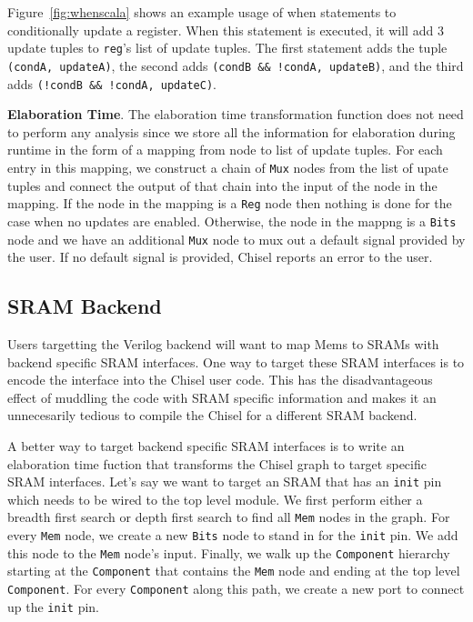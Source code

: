 Figure~\ref{fig:whenscala} shows an example usage of when statements
to conditionally update a register. When this statement is executed,
it will add 3 update tuples to {\tt reg}'s list of update tuples. The
first statement adds the tuple {\tt (condA, updateA)}, the second adds
{\tt (condB \&\& !condA, updateB)}, and the third adds
{\tt (!condB \&\& !condA, updateC)}.

{\bf Elaboration Time}. The elaboration time transformation function
does not need to perform any analysis since we store all the
information for elaboration during runtime in the form of a mapping
from node to list of update tuples. For each entry in this mapping, we
construct a chain of {\tt Mux} nodes from the list of upate tuples and
connect the output of that chain into the input of the node in the
mapping. If the node in the mapping is a {\tt Reg} node then nothing
is done for the case when no updates are enabled. Otherwise, the node
in the mappng is a {\tt Bits} node and we have an additional {\tt Mux}
node to mux out a default signal provided by the user. If no default
signal is provided, Chisel reports an error to the user.

\subsection{SRAM Backend}
Users targetting the Verilog backend will want to map Mems to SRAMs
with backend specific SRAM interfaces. One way to target these SRAM
interfaces is to encode the interface into the Chisel user code. This
has the disadvantageous effect of muddling the code with SRAM specific
information and makes it an unnecesarily tedious to compile the Chisel
for a different SRAM backend.

A better way to target backend specific SRAM interfaces is to write an
elaboration time fuction that transforms the Chisel graph to target
specific SRAM interfaces. Let's say we want to target an SRAM that has
an {\tt init} pin which needs to be wired to the top level module. We
first perform either a breadth first search or depth first search to
find all {\tt Mem} nodes in the graph. For every {\tt Mem} node, we
create a new {\tt Bits} node to stand in for the {\tt init} pin. We
add this node to the {\tt Mem} node's input. Finally, we walk up the
{\tt Component} hierarchy starting at the {\tt Component} that
contains the {\tt Mem} node and ending at the top level
{\tt Component}. For every {\tt Component} along this path, we create
a new port to connect up the {\tt init} pin.

